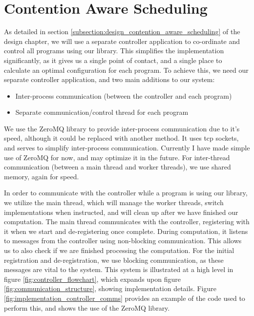 \section{Contention Aware Scheduling}
\label{section:implementation_contention_aware_scheduling}

As detailed in section \ref{subsection:design_contention_aware_scheduling} of the design chapter, we will use a separate controller application to co-ordinate and control all programs using our library. This simplifies the implementation significantly, as it gives us a single point of contact, and a single place to calculate an optimal configuration for each program. To achieve this, we need our separate controller application, and two main additions to our system:

\begin{itemize}
	\item Inter-process communication (between the controller and each program)
	\item Separate communication/control thread for each program
\end{itemize}

We use the ZeroMQ library to provide inter-process communication due to it's speed, although it could be replaced with another method. It uses tcp sockets, and serves to simplify inter-process communication. Currently I have made simple use of ZeroMQ for now, and may optimize it in the future. For inter-thread communication (between a main thread and worker threads), we use shared memory, again for speed.

In order to communicate with the controller while a program is using our library, we utilize the main thread, which will manage the worker threads, switch implementations when instructed, and will clean up after we have finished our computation. The main thread communicates with the controller, registering with it when we start and de-registering once complete. During computation, it listens to messages from the controller using non-blocking communication. This allows us to also check if we are finished processing the computation. For the initial registration and de-registration, we use blocking communication, as these messages are vital to the system. This system is illustrated at a high level in figure \ref{fig:controller_flowchart}, which expands upon figure \ref{fig:communication_structure}, showing implementation details. Figure \ref{fig:implementation_controller_comms} provides an example of the code used to perform this, and shows the use of the ZeroMQ library.



